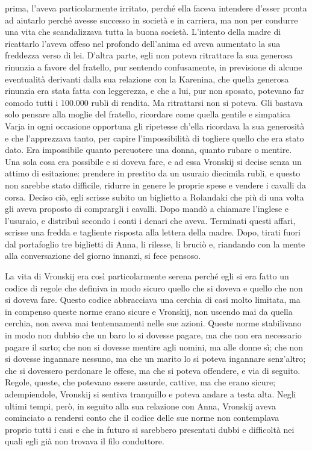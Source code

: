 prima, l'aveva particolarmente irritato, perché ella faceva intendere d'esser pronta ad aiutarlo perché avesse successo in società e in carriera, ma non per condurre una vita che scandalizzava tutta la buona società. L'intento della madre di ricattarlo l'aveva offeso nel profondo dell'anima ed aveva aumentato la sua freddezza verso di lei. D'altra parte, egli non poteva ritrattare la sua generosa rinunzia a favore del fratello, pur sentendo confusamente, in previsione di alcune eventualità derivanti dalla sua relazione con la Karenina, che quella generosa rinunzia era stata fatta con leggerezza, e che a lui, pur non sposato, potevano far comodo tutti i 100.000 rubli di rendita. Ma ritrattarsi non si poteva. Gli bastava solo pensare alla moglie del fratello, ricordare come quella gentile e simpatica Varja in ogni occasione opportuna gli ripetesse ch'ella ricordava la sua generosità e che l'apprezzava tanto, per capire l'impossibilità di togliere quello che era stato dato. Era impossibile quanto percuotere una donna, quanto rubare o mentire. Una sola cosa era possibile e si doveva fare, e ad essa Vronskij si decise senza un attimo di esitazione: prendere in prestito da un usuraio diecimila rubli, e questo non sarebbe stato difficile, ridurre in genere le proprie spese e vendere i cavalli da corsa. Deciso ciò, egli scrisse subito un biglietto a Rolandaki che più di una volta gli aveva proposto di comprargli i cavalli. Dopo mandò a chiamare l'inglese e l'usuraio, e distribuì secondo i conti i denari che aveva. Terminati questi affari, scrisse una fredda e tagliente risposta alla lettera della madre. Dopo, tirati fuori dal portafoglio tre biglietti di Anna, li rilesse, li bruciò e, riandando con la mente alla conversazione del giorno innanzi, si fece pensoso. 

\label{xx-2} 

La vita di Vronskij era così particolarmente serena perché egli si era fatto un codice di regole che definiva in modo sicuro quello che si doveva e quello che non si doveva fare. Questo codice abbracciava una cerchia di casi molto limitata, ma in compenso queste norme erano sicure e Vronskij, non uscendo mai da quella cerchia, non aveva mai tentennamenti nelle sue azioni. Queste norme stabilivano in modo non dubbio che un baro lo si dovesse pagare, ma che non era necessario pagare il sarto; che non si dovesse mentire agli uomini, ma alle donne sì; che non si dovesse ingannare nessuno, ma che un marito lo si poteva ingannare senz'altro; che si dovessero perdonare le offese, ma che si poteva offendere, e via di seguito. Regole, queste, che potevano essere assurde, cattive, ma che erano sicure; adempiendole, Vronskij si sentiva tranquillo e poteva andare a testa alta. Negli ultimi tempi, però, in seguito alla sua relazione con Anna, Vronskij aveva cominciato a rendersi conto che il codice delle sue norme non contemplava proprio tutti i casi e che in futuro si sarebbero presentati dubbi e difficoltà nei quali egli già non trovava il filo conduttore. 

